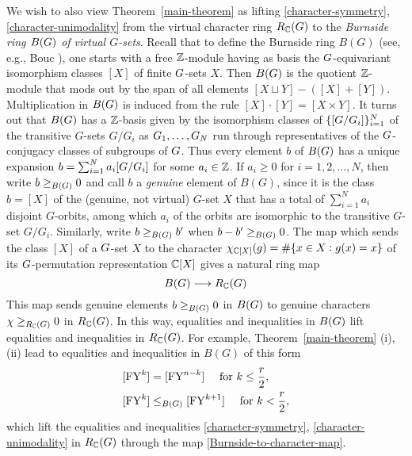 We wish to also view Theorem~\ref{main-theorem} as lifting \eqref{character-symmetry}, \eqref{character-unimodality} from the virtual character ring $R_{\mathbb{C}}(G)$ to the 
{\it Burnside ring $B(G)$ of virtual $G$-sets}.  Recall that to define the Burnside ring $B(G)$
(see, e.g., Bouc \cite{Bouc}), one starts with a free $\mathbb{Z}$-module having as basis the $G$-equivariant isomorphism classes $[X]$ of finite $G$-sets $X$.  Then $B(G)$ is the quotient $\mathbb{Z}$-module that mods out by the span of all elements $[X \sqcup Y] - ([X]+[Y])$.  
Multiplication in $B(G)$ is induced from the rule $[X] \cdot [Y] = [X \times Y]$.
It turns out that $B(G)$ has a $\mathbb{Z}$-basis given by the isomorphism classes of $\{ [G/G_i] \}_{i=1}^N$ of the transitive $G$-sets $G/G_i$ as $G_1,\ldots,G_N$ run through representatives of the $G$-conjugacy classes of subgroups of $G$. 
Thus every element $b$ of $B(G)$ has a unique expansion $b = \sum_{i=1}^N a_i [G/G_i]$ for some $a_i \in \mathbb{Z}$.  If $a_i \geq 0$ for $i=1,2,\ldots,N$, then write $b \geq_{B(G)} 0$ and call $b$ a {\it genuine} element of $B(G)$, 
since it is the class $b=[X]$ 
of the (genuine, not virtual) 
$G$-set $X$ that has a total of  $\sum_{i=1}^N a_i$ disjoint $G$-orbits, among which $a_i$ of the orbits are isomorphic to the transitive $G$-set $G/G_i$.
Similarly, write $b \geq_{B(G)} b'$ when $b-b' \geq_{B(G)} 0$.  The map which sends the class $[X]$ of a $G$-set $X$ to the character $\chi_{\mathbb{C}[X]}(g)=\#\{x \in X:g(x)=x\}$ of its $G$-permutation representation $\mathbb{C}[X]$ gives a natural ring map
\begin{equation}
    \label{Burnside-to-character-map}
B(G) \longrightarrow R_{\mathbb{C}}(G)
\end{equation} 
This map sends genuine elements $b \geq_{B(G)} 0$ in $B(G)$ to genuine characters $\chi \geq_{R_{\mathbb{C}}(G)} 0$ in $R_{\mathbb{C}}(G)$.  In this way, equalities and inequalities in $B(G)$ lift equalities and inequalities in $R_{\mathbb{C}}(G)$.
For example, Theorem~\ref{main-theorem} (i),(ii) 
lead to equalities and inequalities in $B(G)$ of this form
\begin{align}
\label{Burnside-symmetry}
[\mathrm{FY}^k]&=[\mathrm{FY}^{n-k}] 
\quad \text{ for }k \leq \frac{r}{2},\\
\label{Burnside-unimodality}
[\mathrm{FY}^k] &\leq_{B(G)} [\mathrm{FY}^{k+1}]
\quad \text{ for }k < \frac{r}{2},
\end{align}
which lift the equalities and inequalities \eqref{character-symmetry}, \eqref{character-unimodality} in $R_{\mathbb{C}}(G)$
 through the map \eqref{Burnside-to-character-map}.


